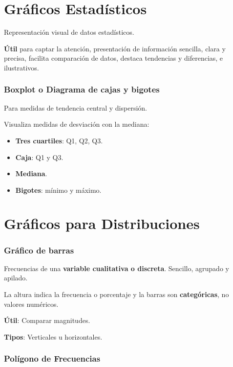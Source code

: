 \documentclass[12pt]{report} %
\begin{document}
\section{Gráficos Estadísticos}

Representación visual de datos estadísticos.

\textbf{Útil} para captar la atención, presentación de información
sencilla, clara y precisa, facilita comparación de datos, destaca
tendencias y diferencias, e ilustrativos.

\hypertarget{boxplot-o-diagrama-de-cajas-y-bigotes}{%
\subsubsection{Boxplot o Diagrama de cajas y
bigotes}\label{boxplot-o-diagrama-de-cajas-y-bigotes}}

Para medidas de tendencia central y dispersión.

Visualiza medidas de desviación con la mediana:

\begin{itemize}

\item
  \textbf{Tres cuartiles}: Q1, Q2, Q3.
\item
  \textbf{Caja}: Q1 y Q3.
\item
  \textbf{Mediana}.
\item
  \textbf{Bigotes}: mínimo y máximo.
\end{itemize}

\section{Gráficos para
Distribuciones}

\hypertarget{gruxe1fico-de-barras}{%
\subsubsection{Gráfico de barras}\label{gruxe1fico-de-barras}}

Frecuencias de una \textbf{variable cualitativa o discreta}. Sencillo,
agrupado y apilado.

La altura indica la frecuencia o porcentaje y la barras son
\textbf{categóricas}, no valores numéricos.

\textbf{Útil}: Comparar magnitudes.

\textbf{Tipos}: Verticales u horizontales.

\hypertarget{poluxedgono-de-frecuencias}{%
\subsubsection{Polígono de
Frecuencias}\label{poluxedgono-de-frecuencias}}
\end{document}
